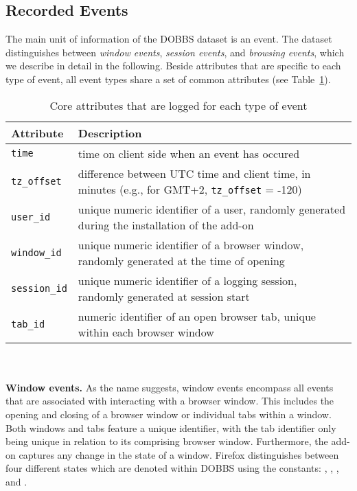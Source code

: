 \documentclass[11pt,fleqn,twoside]{article}
\begin{document}
\subsection{Recorded Events}
\label{sec:data}
The main unit of information of the DOBBS dataset is an event. The dataset distinguishes between \textit{window events}, \textit{session events}, and \textit{browsing events}, which we describe in detail in the following. Beside attributes that are specific to each type of event, all event types share a set of common attributes (see Table~\ref{tab:core_attributes}).
\begin{table}
\small
\begin{center}
\begin{tabular}{|l|p{8cm}|}
  \hline
  \textbf{Attribute} & \textbf{Description} \\
  \hline
  \texttt{time} &  time on client side when an event has occured\\
  \hline
  \texttt{tz\_offset} &  difference between UTC time and client time, in minutes (e.g., for GMT+2, \texttt{tz\_offset} = -120)\\
  \hline
  \texttt{user\_id} &  unique numeric identifier of a user, randomly generated during the installation of the add-on\\
  \hline
  \texttt{window\_id} &  unique numeric identifier of a browser window, randomly generated at the time of opening\\
  \hline
  \texttt{session\_id} &  unique numeric identifier of a logging session, randomly generated at session start\\
  \hline
  \texttt{tab\_id} &  numeric identifier of an open browser tab, unique within each browser window\\
  \hline
\end{tabular} 
\end{center}
\caption{Core attributes that are logged for each type of event} 
\label{tab:core_attributes}
\end{table}
\\
\\
\textbf{Window events.}
As the name suggests, window events encompass all events that are associated with interacting with a browser window. This includes the opening and closing of a browser window or individual tabs within a window. Both windows and tabs feature a unique identifier, with the tab identifier only being unique in relation to its comprising browser window. Furthermore, the add-on captures any change in the state of a window. Firefox distinguishes between four different states which are denoted within DOBBS using the constants: , , , and .
\end{document}
